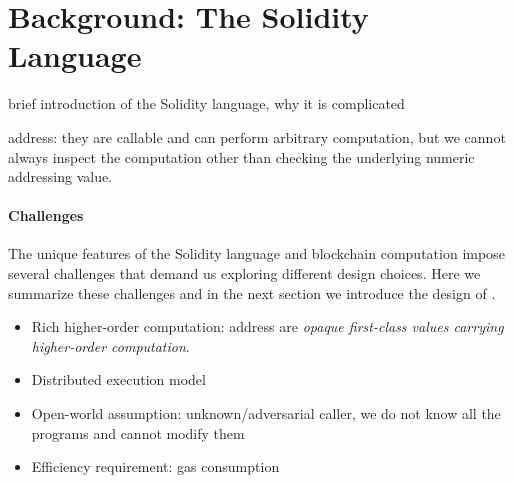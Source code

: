 \section{Background: The Solidity Language}

brief introduction of the Solidity language, why it is complicated

address: they are callable and can perform arbitrary computation, but we cannot always
inspect the computation other than checking the underlying numeric addressing value.

\paragraph{Challenges}
The unique features of the Solidity language and blockchain computation impose
several challenges that demand us exploring different design choices.
Here we summarize these challenges and in the next section we introduce the
design of \lang.

\begin{itemize}
  \item Rich higher-order computation:
    address are \emph{opaque first-class values carrying higher-order computation}.
  \item Distributed execution model
  \item Open-world assumption: unknown/adversarial caller, we do not know all the programs
    and cannot modify them
  \item Efficiency requirement: gas consumption
\end{itemize}
